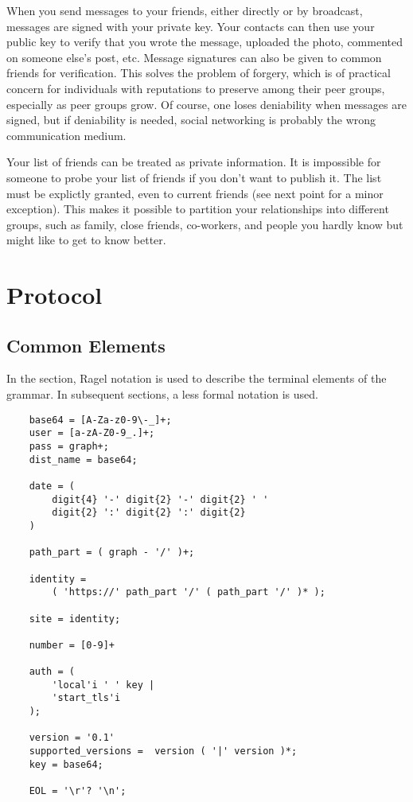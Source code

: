 \documentclass[letterpaper,11pt,oneside]{article}
\begin{document}
When you send messages to your friends, either directly or by broadcast,
messages are signed with your private key. Your contacts can then use your
public key to verify that you wrote the message, uploaded the photo, commented
on someone else's post, etc. Message signatures can also be given to common
friends for verification. This solves the problem of forgery, which is of
practical concern for individuals with reputations to preserve among their peer
groups, especially as peer groups grow. Of course, one loses deniability when
messages are signed, but if deniability is needed, social networking is
probably the wrong communication medium.

Your list of friends can be treated as private information. It is impossible
for someone to probe your list of friends if you don't want to publish it. The
list must be explictly granted, even to current friends (see next point for a
minor exception). This makes it possible to partition your relationships into
different groups, such as family, close friends, co-workers, and people you
hardly know but might like to get to know better.

\section{Protocol}

\subsection{Common Elements}

In the section, Ragel notation is used to describe the terminal elements of the
grammar. In subsequent sections, a less formal notation is used.

\vspace{10pt}
\begin{verbatim}
    base64 = [A-Za-z0-9\-_]+;
    user = [a-zA-Z0-9_.]+;
    pass = graph+;
    dist_name = base64;

    date = (
        digit{4} '-' digit{2} '-' digit{2} ' ' 
        digit{2} ':' digit{2} ':' digit{2} 
    )

    path_part = ( graph - '/' )+;

    identity = 
        ( 'https://' path_part '/' ( path_part '/' )* );

    site = identity;

    number = [0-9]+           

    auth = ( 
        'local'i ' ' key |
        'start_tls'i
    );

    version = '0.1'
    supported_versions =  version ( '|' version )*;
    key = base64;

    EOL = '\r'? '\n';
\end{verbatim}
\end{document}
